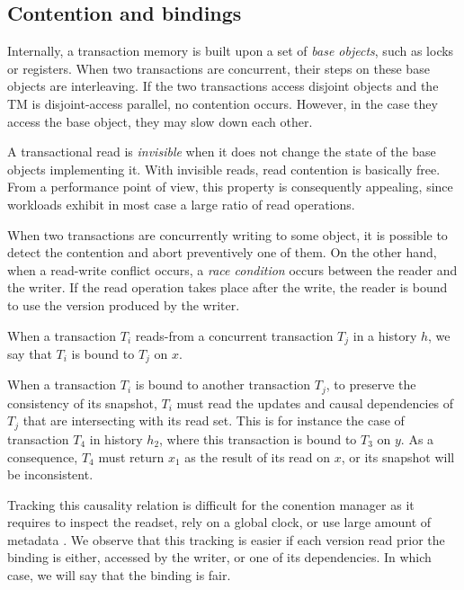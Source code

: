 \subsection{Contention and bindings}

Internally, a transaction memory is built upon a set of \emph{base objects}, such as locks or registers.
When two transactions are concurrent, their steps on these base objects are interleaving.
If the two transactions access disjoint objects and the TM is disjoint-access parallel, no contention occurs.
However, in the case they access the base object, they may slow down each other.

A transactional read is \emph{invisible} when it does not change the state of the base objects implementing it.
With invisible reads, read contention is basically free.
From a performance point of view, this property is consequently appealing, since workloads exhibit in most case a large ratio of read operations.

When two transactions are concurrently writing to some object, it is possible to detect the contention and abort preventively one of them.
On the other hand, when a read-write conflict occurs, a \emph{race condition} occurs between the reader and the writer.
If the read operation takes place after the write, the reader is bound to use the version produced by the writer.

\begin{definition}[Binding]
  When a transaction $T_i$ reads-from a concurrent transaction $T_j$ in a history $h$, we say that $T_i$ is bound to $T_j$ on $x$.
\end{definition}

When a transaction $T_i$ is bound to another transaction $T_j$, to preserve the consistency of its snapshot, $T_i$ must read the updates and causal dependencies of $T_j$ that are intersecting with its read set.
This is for instance the case of transaction $T_4$ in history $h_2$, where this transaction is bound to $T_3$ on $y$.
As a consequence, $T_4$ must return $x_1$ as the result of its read on $x$, or its snapshot will be inconsistent.

Tracking this causality relation is difficult for the conention manager as it requires to inspect the readset, rely on a global clock, or use large amount of metadata \cite{}.
We observe that this tracking is easier if each version read prior the binding is either, accessed by the writer, or one of its dependencies.
In which case, we will say that the binding is fair.

